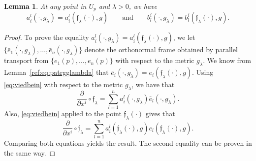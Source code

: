 \documentclass[10pt,a4paper]{amsart}
\numberwithin{equation}{section}
\newtheorem{lem}[thm]{Lemma}
\theoremstyle{definition}
\begin{document}
 \begin{lem}\label{lem:vielbeincomp} At any point in $U_p$ and $\lambda>0$, we have
\[a_{i}^{l}(\cdot,g_\lambda)=a_{i}^{l}(\mathfrak{f}_\lambda(\cdot),g) \qquad\text{and}\qquad b_{l}^{i}(\cdot,g_\lambda)=b_{l}^{i}( {\mathfrak f}_\lambda(\cdot),g).\]
 \end{lem}

\begin{proof}
To prove the equality $a_{i}^{l}(\cdot,g_\lambda)=a_{i}^{l}(\mathfrak{f}_\lambda(\cdot),g)$, we let $\{{\bar e}_1(\cdot,g_\lambda),\dots, {\bar e}_n(\cdot,g_\lambda)\}$ denote the orthonormal frame obtained by parallel transport from $\{e_1(p),\dots,e_n(p)\}$ with respect to the metric $g_\lambda$. We know from Lemma~\ref{ref:eq:patrgglambda} that ${\bar e}_i(\cdot,g_\lambda)=e_i(\mathfrak{f}_\lambda(\cdot),g)$. Using \eqref{eq:viedbein} with respect to the metric $g_\lambda$, we have that
\[\frac{\partial}{\partial x^i}\circ \mathfrak{f}_\lambda=\sum_{l=1}^n a_i^l(\cdot,g_\lambda) \bar{e}_l(\cdot,g_\lambda).\]
Also, \eqref{eq:viedbein} applied to the point $\mathfrak{f}_\lambda(\cdot)$ gives that
\[\frac{\partial}{\partial x^i}\circ \mathfrak{f}_\lambda=\sum_{l=1}^n a_i^l(\mathfrak{f}_\lambda(\cdot),g) e_l(\mathfrak{f}_\lambda(\cdot),g).\]
Comparing both equations yields the result. The second equality can be proven in the same way.
\end{proof}
\end{document}
